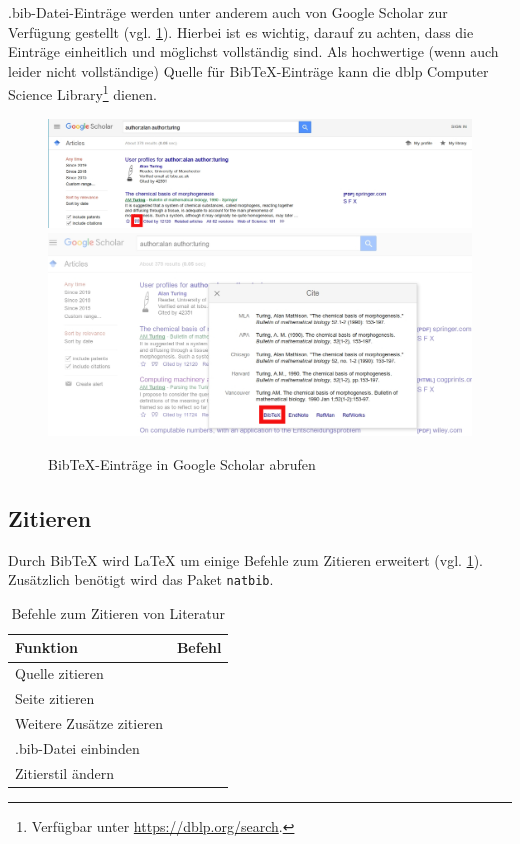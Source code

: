 .bib-Datei-Einträge werden unter anderem auch von Google Scholar zur Verfügung gestellt (vgl. \cref{fig:google-scholar-bibtex}).
Hierbei ist es wichtig, darauf zu achten, dass die Einträge einheitlich und möglichst vollständig sind.
Als hochwertige (wenn auch leider nicht vollständige) Quelle für Bib\TeX-Einträge kann die dblp Computer Science Library\footnote{Verfügbar unter \url{https://dblp.org/search}.} dienen.

\begin{figure}[H]
  \includegraphics[width=\textwidth]{graphics/google_bibtex1.jpg}  
  \includegraphics[width=\textwidth]{graphics/google_bibtex2.jpg}  
  \caption{Bib\TeX-Einträge in Google Scholar abrufen}
  \label{fig:google-scholar-bibtex}
\end{figure}

\subsection{Zitieren}
Durch Bib\TeX{} wird \LaTeX{} um einige Befehle zum Zitieren erweitert (vgl. \cref{tbl:bibtex-commands}). 
Zusätzlich benötigt wird das Paket \texttt{natbib}.

\begin{table}[H]
  \centering
  \begin{tabular}{ll}
  \toprule
  Funktion                 & Befehl \\ \midrule
  Quelle zitieren          & \texttt{\cite{<quelle>}} \\
  Seite zitieren           & \texttt{\cite[S. 15]{<quelle>}} \\
  Weitere Zusätze zitieren & \texttt{\cite[<präfix>][<suffix>]{<quelle>}} \\
  .bib-Datei einbinden     & \texttt{} \\
  Zitierstil ändern        & \texttt{} \\ \bottomrule
  \end{tabular}
  \caption{Befehle zum Zitieren von Literatur}
  \label{tbl:bibtex-commands}
\end{table}

